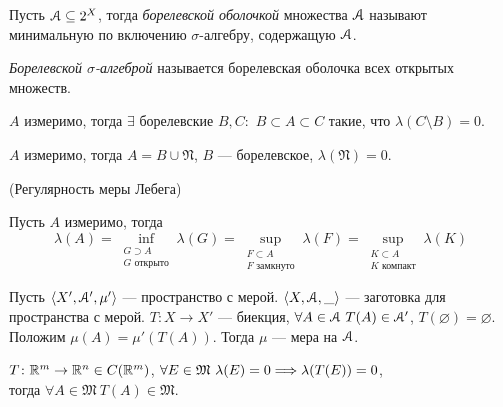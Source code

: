 \begin{definition}
    Пусть $\mathcal{A} \subseteq 2^X$, тогда \textit{борелевской оболочкой} множества $\mathcal{A}$
    называют минимальную по включению $\sigma$-алгебру, содержащую $\mathcal{A}$.
\end{definition}

\begin{definition}
    \textit{Борелевской $\sigma$-алгеброй} называется борелевская оболочка
    всех открытых множеств.
\end{definition}

\begin{corollary}
    $A$ измеримо, тогда $\exists$ борелевские $B, C\colon$ $B \subset A \subset C$
    такие, что $\lambda(C \setminus B) = 0$.
\end{corollary}

\begin{corollary}
    $A$ измеримо, тогда $A = B \cup \mathfrak{N}$, $B$ --- борелевское,
    $\lambda(\mathfrak{N}) = 0$.
\end{corollary}

\begin{corollary}(Регулярность меры Лебега)

    Пусть $A$ измеримо, тогда
\[
    \lambda(A) = \inf_{\substack{G \supset A \\ G \text{ открыто}}}{\lambda(G)}
    = \sup_{\substack{F \subset A \\ F \text{ замкнуто}}}{\lambda(F)}
    = \sup_{\substack{K \subset A \\ K \text{ компакт}}}{\lambda(K)}
\]
\end{corollary}

\begin{lemma}

    Пусть $\langle X', \mathcal{A}', \mu' \rangle$ --- пространство с мерой.
    $\langle X, \mathcal{A}, \_ \rangle$ --- заготовка для пространства с мерой.
    $T \colon X \to X'$ --- биекция, $\forall A \in \mathcal{A}~ T(A) \in \mathcal{A}'$,
    $T(\varnothing) = \varnothing$. Положим $\mu(A) = \mu'(T(A))$. Тогда
    $\mu$ --- мера на $\mathcal{A}$.
\end{lemma}

\begin{lemma}
    $T \colon \mathbb{R}^m \to \mathbb{R}^n \in C(\mathbb{R}^m)$, $\forall E \in \mathfrak{M}~ \lambda(E) = 0
    \Longrightarrow \lambda(T(E)) = 0$, \\ тогда $\forall A \in \mathfrak{M}~ T(A) \in \mathfrak{M}$.
\end{lemma}

\let\x\undefined
\let\y\undefined
\let\h\undefined
\let\w\undefined
\let\z\undefined
\let\Od\undefined
\let\N\undefined
\let\C\undefined
